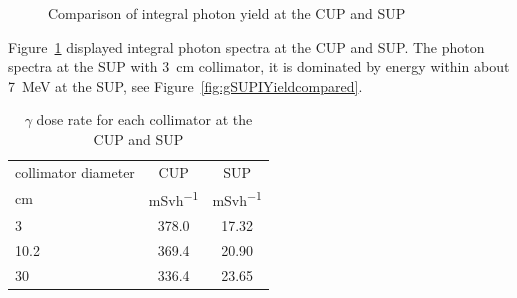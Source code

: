 \documentclass[12pt,journal]{IEEEtran}
\let\MYoriglatexcaption\caption
\renewcommand{\caption}[2][\relax]{\MYoriglatexcaption[#2]{#2}}
\begin{document}
\begin{figure}[!t]
	\centering
	\vfil
	\caption{Comparison of integral photon yield at the CUP and SUP}
	\label{fig:gIYieldspectra}
\end{figure}
Figure~\ref{fig:gIYieldspectra} displayed integral photon spectra at the CUP and SUP. The photon spectra at the SUP with \SI{3}{\cm} collimator, it is dominated by energy within about \SI{7}{\MeV} at the SUP, see Figure~\ref{fig:gSUPIYieldcompared}.

\begin{table}
\caption{$\gamma$ dose rate for each collimator at the CUP and SUP}	%
\centering
\label{Table:DoseRate}
        \begin{tabular}{l c c}
            \toprule
            {collimator diameter}   &{CUP}         &{SUP}\\
            {\si{\centi\metre}}    &{\si{mSvh^{-1}}}   &{\si{mSvh^{-1}}}\\
            \midrule
            3                       & 378.0                	& 17.32\\
            10.2                  & 369.4               	& 20.90\\
            30                     & 336.4          		& 23.65\\
            \bottomrule
\end{tabular}
\end{table}
\end{document}
